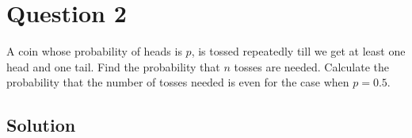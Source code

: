 \section*{Question 2}

A coin whose probability of heads is \(p\), is tossed repeatedly till we get at least one head and one tail.
Find the probability that \(n\) tosses are needed.
Calculate the probability that the number of tosses needed is even for the case when \(p = 0.5\).

\subsection*{Solution}
